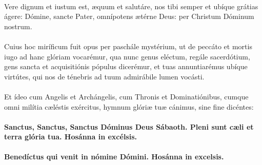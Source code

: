 \documentclass[12pt, a4paper]{article}
\begin{document}
	\\
	\\
	\\
	\\
	\\\\
	Vere dignum et iustum est, æquum
	et salutáre, nos tibi semper et
	ubíque grátias ágere: Dómine,
	sancte Pater, omnípotens ætérne
	Deus: per Christum Dóminum
	nostrum.
	\\\\
	Cuius hoc miríficum fuit opus per
	paschále mystérium, ut de peccáto
	et mortis iugo ad hanc glóriam
	vocarémur, qua nunc genus
	eléctum, regále sacerdótium, gens
	sancta et acquisitiónis pópulus
	dicerémur, et tuas annuntiarémus
	ubíque virtútes, qui nos de ténebris
	ad tuum admirábile lumen vocásti.
	\\\\
	Et ídeo cum Angelis et
	Archángelis, cum Thronis et
	Dominatiónibus, cumque omni
	milítia cæléstis exércitus, hymnum
	glóriæ tuæ cánimus, sine fine
	dicéntes:
	\\\\
	\textbf{Sanctus, Sanctus, Sanctus Dóminus
		Deus Sábaoth. Pleni sunt cæli et
		terra glória tua. Hosánna in
		excélsis.}
	\\\\
	\textbf{Benedíctus qui venit in nómine
		Dómini. Hosánna in excelsis.}
	
	\newpage
	
\end{document}
